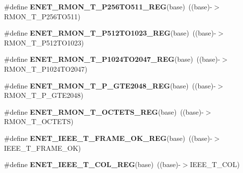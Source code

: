 \begin{DoxyCompactItemize}
\item 
\#define {\bfseries E\+N\+E\+T\+\_\+\+R\+M\+O\+N\+\_\+\+T\+\_\+\+P256\+T\+O511\+\_\+\+R\+EG}(base)~((base)-\/$>$R\+M\+O\+N\+\_\+\+T\+\_\+\+P256\+T\+O511)\hypertarget{group__ENET__Register__Accessor__Macros_ga262439a7f1d338d06bab85d00c8500d9}{}\label{group__ENET__Register__Accessor__Macros_ga262439a7f1d338d06bab85d00c8500d9}

\item 
\#define {\bfseries E\+N\+E\+T\+\_\+\+R\+M\+O\+N\+\_\+\+T\+\_\+\+P512\+T\+O1023\+\_\+\+R\+EG}(base)~((base)-\/$>$R\+M\+O\+N\+\_\+\+T\+\_\+\+P512\+T\+O1023)\hypertarget{group__ENET__Register__Accessor__Macros_gaea527dbb4c59c6f6f516c63efff1392e}{}\label{group__ENET__Register__Accessor__Macros_gaea527dbb4c59c6f6f516c63efff1392e}

\item 
\#define {\bfseries E\+N\+E\+T\+\_\+\+R\+M\+O\+N\+\_\+\+T\+\_\+\+P1024\+T\+O2047\+\_\+\+R\+EG}(base)~((base)-\/$>$R\+M\+O\+N\+\_\+\+T\+\_\+\+P1024\+T\+O2047)\hypertarget{group__ENET__Register__Accessor__Macros_gad9a42bdbd68d55b77bce407c60ba2ea1}{}\label{group__ENET__Register__Accessor__Macros_gad9a42bdbd68d55b77bce407c60ba2ea1}

\item 
\#define {\bfseries E\+N\+E\+T\+\_\+\+R\+M\+O\+N\+\_\+\+T\+\_\+\+P\+\_\+\+G\+T\+E2048\+\_\+\+R\+EG}(base)~((base)-\/$>$R\+M\+O\+N\+\_\+\+T\+\_\+\+P\+\_\+\+G\+T\+E2048)\hypertarget{group__ENET__Register__Accessor__Macros_ga10558658ffdc68e34d98a8e5a654bbd1}{}\label{group__ENET__Register__Accessor__Macros_ga10558658ffdc68e34d98a8e5a654bbd1}

\item 
\#define {\bfseries E\+N\+E\+T\+\_\+\+R\+M\+O\+N\+\_\+\+T\+\_\+\+O\+C\+T\+E\+T\+S\+\_\+\+R\+EG}(base)~((base)-\/$>$R\+M\+O\+N\+\_\+\+T\+\_\+\+O\+C\+T\+E\+TS)\hypertarget{group__ENET__Register__Accessor__Macros_ga7886f23c97239dd209b1be39052faae6}{}\label{group__ENET__Register__Accessor__Macros_ga7886f23c97239dd209b1be39052faae6}

\item 
\#define {\bfseries E\+N\+E\+T\+\_\+\+I\+E\+E\+E\+\_\+\+T\+\_\+\+F\+R\+A\+M\+E\+\_\+\+O\+K\+\_\+\+R\+EG}(base)~((base)-\/$>$I\+E\+E\+E\+\_\+\+T\+\_\+\+F\+R\+A\+M\+E\+\_\+\+OK)\hypertarget{group__ENET__Register__Accessor__Macros_ga59cc01d88c2b9f9cdec674e530c4f9a2}{}\label{group__ENET__Register__Accessor__Macros_ga59cc01d88c2b9f9cdec674e530c4f9a2}

\item 
\#define {\bfseries E\+N\+E\+T\+\_\+\+I\+E\+E\+E\+\_\+\+T\+\_\+C\+O\+L\+\_\+\+R\+EG}(base)~((base)-\/$>$I\+E\+E\+E\+\_\+\+T\+\_\+C\+OL)\hypertarget{group__ENET__Register__Accessor__Macros_ga804822cbaf00371d46938d8a469d8c20}{}\label{group__ENET__Register__Accessor__Macros_ga804822cbaf00371d46938d8a469d8c20}


\end{DoxyCompactItemize}
